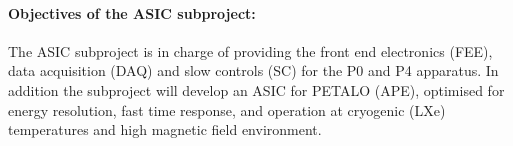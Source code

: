 \paragraph{Objectives of the ASIC subproject:}
The ASIC subproject is in charge of providing the front end electronics (FEE), data acquisition (DAQ) and slow controls (SC) for the P0 and P4 apparatus.  In addition the subproject will develop an ASIC for PETALO (APE), optimised for energy resolution, fast time response, and operation at cryogenic (LXe) temperatures and high magnetic field environment.


